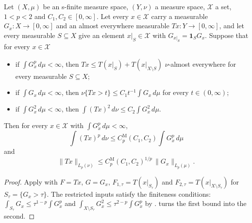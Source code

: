 \begin{theorem}
\label{thm:marcinkiewicz-abstract}
\leanok
{}
Let $(X, \mu)$ be an s-finite measure space, $(Y, \nu)$ a measure space, $\mathcal X$ a set,
$1 < p < 2$ and $C_1, C_2 \in [0, \infty]$. Let every $x \in \mathcal X$ carry a measurable
$G_x : X \to [0, \infty]$ and an almost everywhere measurable $T x : Y \to [0, \infty]$, and let
every measurable $S \subseteq X$ give an element $x|_S \in \mathcal X$ with
$G_{x|_S} = \mathbf 1_S G_x$. Suppose that for every $x \in \mathcal X$
\begin{itemize}
  \item if $\int G_x^p \, d\mu < \infty$, then $T x \leq T(x|_S) + T(x|_{X \setminus S})$
  $\nu$-almost everywhere for every measurable $S \subseteq X$;
  \item if $\int G_x \, d\mu < \infty$, then $\nu\{T x > t\} \leq C_1 t^{-1} \int G_x \, d\mu$
  for every $t \in (0, \infty)$;
  \item if $\int G_x^2 \, d\mu < \infty$, then
  $\int (T x)^2 \, d\nu \leq C_2 \int G_x^2 \, d\mu$.
\end{itemize}
Then for every $x \in \mathcal X$ with $\int G_x^p \, d\mu < \infty$,
\[
  \int (T x)^p \, d\nu \leq C^{\mathrm M}_p(C_1, C_2) \int G_x^p \, d\mu
\]
and
\[
  \|T x\|_{L_p(\nu)} \leq C^{\mathrm M}_p(C_1, C_2)^{1/p} \, \|G_x\|_{L_p(\mu)} .
\]
\end{theorem}

\begin{proof}
\leanok
Apply  with $F = T x$, $G = G_x$,
$F_{1, \tau} = T(x|_{S_\tau})$ and $F_{2, \tau} = T(x|_{X \setminus S_\tau})$ for
$S_\tau = \{G_x > \tau\}$. The restricted inputs satisfy the finiteness conditions:
$\int_{S_\tau} G_x \leq \tau^{1-p} \int G_x^p$ and
$\int_{X \setminus S_\tau} G_x^2 \leq \tau^{2-p} \int G_x^p$ by
.  turns the first
bound into the second.
\end{proof}

